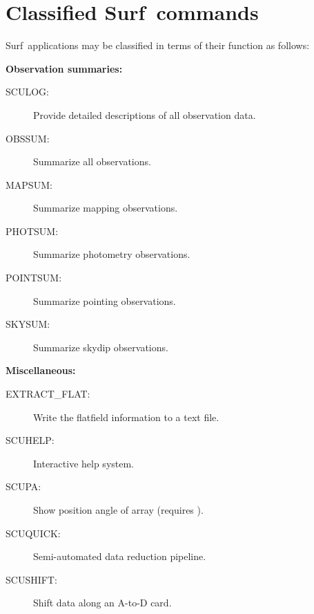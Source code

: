 \documentclass[twoside,11pt]{article}
\newcommand{\scusoft}          {{\sc Surf}}
\newcommand{\Kappa}{\xref{{\sc{Kappa}}}{sun95}{}}
\newcommand{\htmlref}[2]{#1}
\newcommand{\xref}[3]{#1}
\newcommand{\xlabel}[1]{}
\begin{document}
\section{\xlabel{classified}Classified \scusoft\ commands\label{classified}}

\scusoft\ applications may be classified in terms of their function as 
follows:


\begin{description}

\item \textbf{Observation summaries:}

\begin{description}

\item[\htmlref{SCULOG}{SCULOG}:] Provide detailed descriptions of all
observation  data.

\item[\htmlref{OBSSUM}{OBSSUM}:] Summarize all observations.

\item[\htmlref{MAPSUM}{MAPSUM}:] Summarize mapping observations.

\item[\htmlref{PHOTSUM}{PHOTSUM}:] Summarize photometry observations.

\item[\htmlref{POINTSUM}{POINTSUM}:] Summarize pointing observations.

\item[\htmlref{SKYSUM}{SKYSUM}:] Summarize skydip observations.

\end{description}

\item \textbf{Miscellaneous:}

\begin{description}

\item[\htmlref{EXTRACT\_FLAT}{EXTRACT_FLAT}:] Write the flatfield information
to a text file.

\item[\htmlref{SCUHELP}{SCUHELP}:] Interactive help system.

\item[\htmlref{SCUPA}{SCUPA}:] Show position angle of array (requires \Kappa).

\item[\htmlref{SCUQUICK}{SCUQUICK}:] Semi-automated data reduction pipeline.

\item[\htmlref{SCUSHIFT}{SCUSHIFT}:] Shift data along an A-to-D card.


\end{description}
\end{description}
\end{document}
